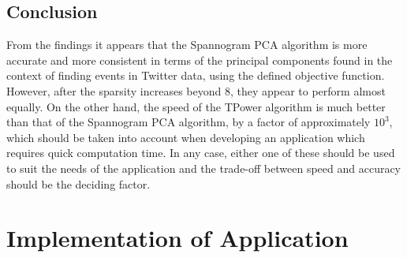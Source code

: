 \documentclass[11pt,a4paper]{article}
\begin{document}
\subsection{Conclusion}

From the findings it appears that the Spannogram PCA algorithm is more accurate and more consistent in terms of the principal components found in the context of finding events in Twitter data, using the defined objective function. However, after the sparsity increases beyond 8, they appear to perform almost equally. On the other hand, the speed of the TPower algorithm is much better than that of the Spannogram PCA algorithm, by a factor of approximately $10^3$, which should be taken into account when developing an application which requires quick computation time. In any case, either one of these should be used to suit the needs of the application and the trade-off between speed and accuracy should be the deciding factor. 
\clearpage



\section{Implementation of Application}

\end{document}
